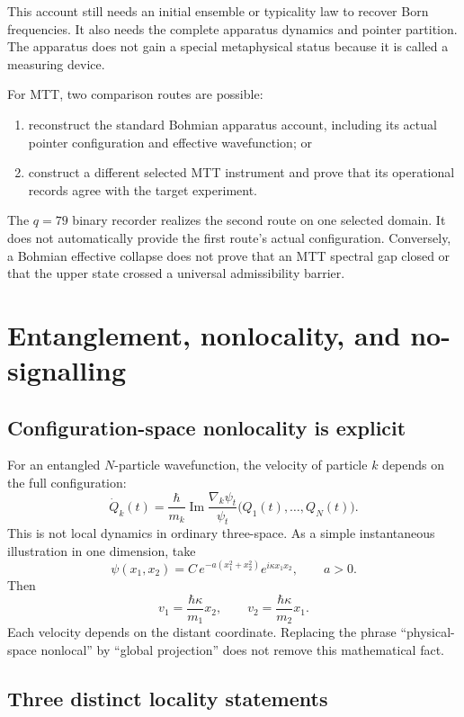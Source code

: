 \documentclass[11pt]{article}
\theoremstyle{definition}
\theoremstyle{remark}
\let\MTToriginalitem\item
\renewcommand{\item}{\par\MTToriginalitem}
\begin{document}
This account still needs an initial ensemble or typicality law to recover
Born frequencies.  It also needs the complete apparatus dynamics and
pointer partition.  The apparatus does not gain a special metaphysical
status because it is called a measuring device.

For MTT, two comparison routes are possible:
\begin{enumerate}[leftmargin=2em]
\item reconstruct the standard Bohmian apparatus account, including its
      actual pointer configuration and effective wavefunction; or
\item construct a different selected MTT instrument and prove that its
      operational records agree with the target experiment.
\end{enumerate}
The \(q=79\) binary recorder realizes the second route on one selected
domain.  It does not automatically provide the first route's actual
configuration.  Conversely, a Bohmian effective collapse does not prove
that an MTT spectral gap closed or that the upper state crossed a universal
admissibility barrier.

\section{Entanglement, nonlocality, and no-signalling}
\label{sec:locality}

\subsection{Configuration-space nonlocality is explicit}

For an entangled \(N\)-particle wavefunction, the velocity of particle \(k\)
depends on the full configuration:
\[
\dot Q_k(t)
=
\frac{\hbar}{m_k}
\operatorname{Im}
\frac{\nabla_k\psi_t}{\psi_t}
\bigl(Q_1(t),\ldots,Q_N(t)\bigr).
\]
This is not local dynamics in ordinary three-space.  As a simple
instantaneous illustration in one dimension, take
\[
\psi(x_1,x_2)
=C\,e^{-a(x_1^2+x_2^2)}e^{i\kappa x_1x_2},
\qquad a>0 .
\]
Then
\[
v_1=\frac{\hbar\kappa}{m_1}x_2,
\qquad
v_2=\frac{\hbar\kappa}{m_2}x_1.
\]
Each velocity depends on the distant coordinate.  Replacing the phrase
``physical-space nonlocal'' by ``global projection'' does not remove this
mathematical fact.

\subsection{Three distinct locality statements}
\end{document}
